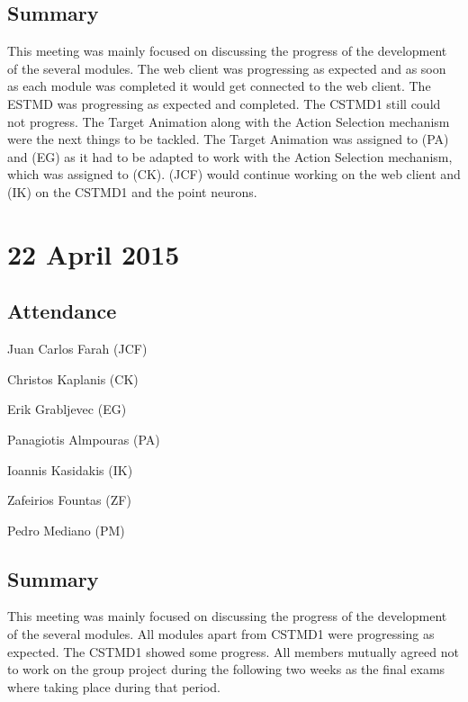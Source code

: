 \documentclass[a4paper,11pt]{article}
\begin{document}
\begin{appendices}
\subsection*{Summary}
This meeting was mainly focused on discussing the progress of the development of the several modules. The web client was progressing as expected and as soon as each module was completed it would get connected to the web client. The ESTMD was progressing as expected and completed. The CSTMD1 still could not progress. The Target Animation along with the Action Selection mechanism were the next things to be tackled. The Target Animation was assigned to (PA) and (EG) as it had to be adapted to work with the Action Selection mechanism, which was assigned to (CK). (JCF) would continue working on the web client and (IK) on the CSTMD1 and the point neurons.

\maketitle
\section*{22 April 2015}
\subsection*{Attendance}
\begin{compactenum}
\item Juan Carlos Farah (JCF)
\item Christos Kaplanis (CK)
\item Erik Grabljevec (EG)
\item Panagiotis Almpouras (PA)
\item Ioannis Kasidakis (IK)
\item Zafeirios Fountas (ZF)
\item Pedro Mediano (PM)
\end{compactenum}

\subsection*{Summary}
This meeting was mainly focused on discussing the progress of the development of the several modules. All modules apart from CSTMD1 were progressing as expected. The CSTMD1 showed some progress. All members mutually agreed not to work on the group project during the following two weeks as the final exams where taking place during that period.


\end{appendices}
\end{document}

